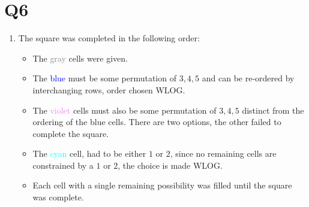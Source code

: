 \documentclass[a4paper, 11pt]{article}
\begin{document}

\pagebreak
\section*{Q6}
\begin{enumerate}[label=(\alph*)]
	\item The square was completed in the following order:
	\begin{itemize}
		\item The \textcolor{gray}{gray} cells were given. 
		\item The \textcolor{blue}{blue} must be some permutation of $3,4,5$ and can be re-ordered by interchanging rows, order chosen WLOG. 
		\item The \textcolor{violet}{violet} cells must also be some permutation of $3,4,5$ distinct from the ordering of the blue cells. There are two options, the other failed to complete the square. 
		\item The \textcolor{cyan}{cyan} cell, had to be either $1$ or $2$, since no remaining cells are constrained by a $1$ or $2$, the choice is made WLOG.
		\item Each cell with a single remaining possibility was filled until the square was complete. 
	\end{itemize}



	\begin{center}
\end{center}
\end{enumerate}
\end{document}
